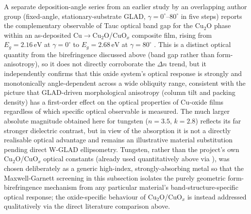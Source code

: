 \documentclass[aip,amsmath,amssymb,reprint]{revtex4-1}
\begin{document}
A separate deposition-angle series from an earlier study by an overlapping
author group (fixed-angle, stationary-substrate GLAD, $\gamma = 0^{\circ}$--$80^{\circ}$
in five steps) reports the complementary observable of Tauc optical band
gap for the Cu$_2$O phase within an as-deposited Cu$\to$Cu$_2$O/CuO$_x$
composite film, rising from $E_g = 2.16\,\mathrm{eV}$ at $\gamma = 0^{\circ}$
to $E_g = 2.68\,\mathrm{eV}$ at $\gamma = 80^{\circ}$ \citep{tounsi2015}. This
is a distinct optical quantity from the birefringence discussed above (band
gap rather than form-anisotropy), so it does not directly corroborate the
$\Delta n$ trend, but it independently confirms that this oxide system's
optical response is strongly and monotonically angle-dependent across a wide
obliquity range, consistent with the picture that GLAD-driven morphological
anisotropy (column tilt and packing density) has a first-order effect on the
optical properties of Cu-oxide films regardless of which specific optical
observable is measured.
The much larger absolute magnitude obtained here for tungsten
($n = 3.5$, $k = 2.8$) reflects its far stronger dielectric contrast, but in
view of the absorption it is not a directly realisable optical advantage and
remains an illustrative material substitution pending direct W-GLAD
ellipsometry.
Tungsten, rather than the project's own Cu$_2$O/CuO$_x$ optical constants
(already used quantitatively above via \citep{chaffar2018,chaffar2019}), was
chosen deliberately as a generic high-index, strongly-absorbing metal so that
the Maxwell-Garnett screening in this subsection isolates the purely
geometric form-birefringence mechanism from any particular material's
band-structure-specific optical response; the oxide-specific behaviour of
Cu$_2$O/CuO$_x$ is instead addressed qualitatively via the direct literature
comparison above.
\end{document}
